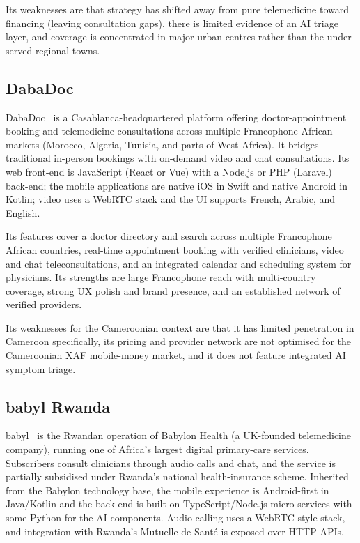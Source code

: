 Its weaknesses are that strategy has shifted away from pure telemedicine toward financing (leaving consultation gaps), there is limited evidence of an AI triage layer, and coverage is concentrated in major urban centres rather than the under-served regional towns.

\subsection{DabaDoc}

DabaDoc~\cite{dabadoc} is a Casablanca-headquartered platform offering doctor-appointment booking and telemedicine consultations across multiple Francophone African markets (Morocco, Algeria, Tunisia, and parts of West Africa). It bridges traditional in-person bookings with on-demand video and chat consultations. Its web front-end is JavaScript (React or Vue) with a Node.js or PHP (Laravel) back-end; the mobile applications are native iOS in Swift and native Android in Kotlin; video uses a WebRTC stack and the UI supports French, Arabic, and English.

Its features cover a doctor directory and search across multiple Francophone African countries, real-time appointment booking with verified clinicians, video and chat teleconsultations, and an integrated calendar and scheduling system for physicians. Its strengths are large Francophone reach with multi-country coverage, strong UX polish and brand presence, and an established network of verified providers.

Its weaknesses for the Cameroonian context are that it has limited penetration in Cameroon specifically, its pricing and provider network are not optimised for the Cameroonian XAF mobile-money market, and it does not feature integrated AI symptom triage.

\subsection{babyl Rwanda}

babyl~\cite{babyl_rwanda} is the Rwandan operation of Babylon Health (a UK-founded telemedicine company), running one of Africa's largest digital primary-care services. Subscribers consult clinicians through audio calls and chat, and the service is partially subsidised under Rwanda's national health-insurance scheme. Inherited from the Babylon technology base, the mobile experience is Android-first in Java/Kotlin and the back-end is built on TypeScript/Node.js micro-services with some Python for the AI components. Audio calling uses a WebRTC-style stack, and integration with Rwanda's Mutuelle de Sant\'e is exposed over HTTP APIs.

